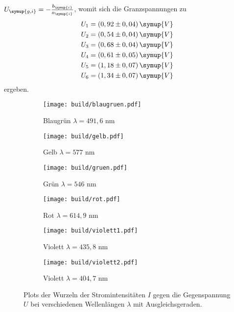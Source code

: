 $U_{\symup{g, i}} = - \frac{b_{\symup{i}}}{a_{\symup{i}}}$, womit sich die Granzspannungen zu 
\begin{align*}
  U_1 &= (0,92 \pm 0,04) \, \symup{V} \\
  U_2 &= (0,54 \pm 0,04) \, \symup{V} \\
  U_3 &= (0,68 \pm 0,04) \, \symup{V} \\
  U_4 &= (0,61 \pm 0,05) \, \symup{V} \\
  U_5 &= (1,18 \pm 0,07) \, \symup{V} \\
  U_6 &= (1,34 \pm 0,07) \, \symup{V} \\
\end{align*}
ergeben.


\begin{figure}
  \centering
  \begin{subfigure}{0.49\textwidth}
    \centering
    \texttt{[image: build/blaugruen.pdf]}
    \caption{Blaugrün $\lambda = 491,6$ nm}
  \end{subfigure}
  \begin{subfigure}{0.49\textwidth}
    \centering
    \texttt{[image: build/gelb.pdf]}
    \caption{Gelb $\lambda = 577$ nm}
  \end{subfigure}

  \begin{subfigure}{0.49\textwidth}
    \centering
    \texttt{[image: build/gruen.pdf]}
    \caption{Grün $\lambda = 546$ nm}
  \end{subfigure}
  \begin{subfigure}{0.49\textwidth}
    \centering
    \texttt{[image: build/rot.pdf]}
    \caption{Rot $\lambda = 614,9$ nm}
  \end{subfigure}

  \begin{subfigure}{0.49\textwidth}
    \centering
    \texttt{[image: build/violett1.pdf]}
    \caption{Violett $\lambda = 435,8$ nm}
  \end{subfigure}
  \begin{subfigure}{0.49\textwidth}
    \centering
    \texttt{[image: build/violett2.pdf]}
    \caption{Violett $\lambda = 404,7$ nm}
  \end{subfigure}
  \caption{Plots der Wurzeln der Stromintensitäten $I$ gegen die Gegenspannung $U$ bei verschiedenen Wellenlängen $\lambda$ mit Ausgleichsgeraden.}
  \label{fig:farben}
\end{figure}


